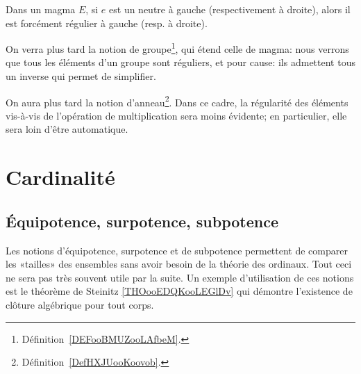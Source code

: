 \begin{remark}	\label{REMooMagmasEltsReguliers}
	Dans un magma \( E \), si \( e \) est un neutre à gauche (respectivement à droite), alors il est forcément régulier à gauche (resp. à droite).

	On verra plus tard la notion de groupe\footnote{Définition~\ref{DEFooBMUZooLAfbeM}.}, qui étend celle de magma: nous verrons que tous les éléments d'un groupe sont réguliers, et pour cause: ils admettent tous un inverse qui permet de simplifier.

	On aura plus tard la notion d'anneau\footnote{Définition~\ref{DefHXJUooKoovob}.}. Dans ce cadre, la régularité des éléments vis-à-vis de l'opération de multiplication sera moins évidente; en particulier, elle sera loin d'être automatique.
\end{remark}


\section{Cardinalité}
\label{SECooCardinalite}


\subsection{Équipotence, surpotence, subpotence}
\label{SUBooEquiSurSubpotence}

\begin{normaltext}	\label{NORMooEquiSurSubpotence}
	Les notions d'équipotence, surpotence et de subpotence permettent de comparer les «tailles» des ensembles sans avoir besoin de la théorie des ordinaux. Tout ceci ne sera pas très souvent utile par la suite. Un exemple d'utilisation de ces notions est le théorème de Steinitz \ref{THOooEDQKooLEGlDv} qui démontre l'existence de clôture algébrique pour tout corps.
\end{normaltext}

